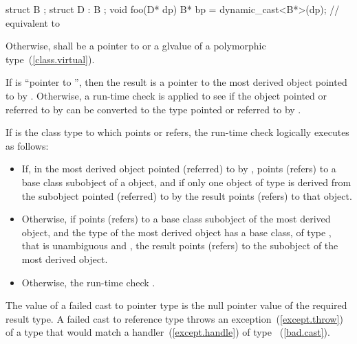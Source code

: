 \begin{codeblock}
struct B { };
struct D : B { };
void foo(D* dp) {
  B*  bp = dynamic_cast<B*>(dp);    // equivalent to 
}
\end{codeblock}
\exitexample 

\pnum
Otherwise,  shall be a pointer to or a glvalue of a polymorphic
type~(\ref{class.virtual}).

\pnum
If  is ``pointer to  '', then the result
is a pointer to the most derived object pointed to by .
Otherwise, a run-time check is applied to see if the object pointed or
referred to by  can be converted to the type pointed or
referred to by .

\pnum
If  is the class type to which  points or refers, the run-time
check logically executes as follows:

\begin{itemize}
\item If, in the most derived object pointed (referred) to by ,
 points (refers) to a  base class subobject of a
 object, and if only one object of type  is derived
from the subobject pointed (referred) to by  the result points (refers) to that  object.

\item Otherwise, if  points (refers) to a  base
class subobject of the most derived object, and the type of the most
derived object has a base class, of type , that is unambiguous
and , the result points (refers) to the
 subobject of the most derived object.

\item Otherwise, the
run-time check .
\end{itemize}

\pnum
The value of a failed cast to pointer type is the null pointer value of
the required result type. A failed cast to reference type throws
an exception~(\ref{except.throw}) of a type that would match a
handler~(\ref{except.handle}) of type ~(\ref{bad.cast}).

%
%
\enterexample 

